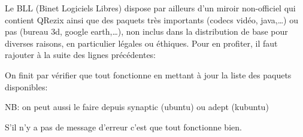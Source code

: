 Le BLL (Binet Logiciels Libres) dispose par ailleurs d'un miroir non-officiel qui contient QRezix ainsi que des paquets tr\`es importants (codecs
vid\'eo, java,\dots) ou pas (bureau 3d, google earth,\dots), non inclus dans la distribution de base pour diverses raisons, en particulier l\'egales ou
\'ethiques. Pour en profiter, il faut rajouter \`a la suite des lignes pr\'ec\'edentes:



On finit par v\'erifier que tout fonctionne en mettant \`a jour la liste
des paquets disponibles:


NB: on peut aussi le faire depuis synaptic (ubuntu) ou adept (kubuntu)

S'il n'y a pas de message d'erreur c'est que tout fonctionne bien.
